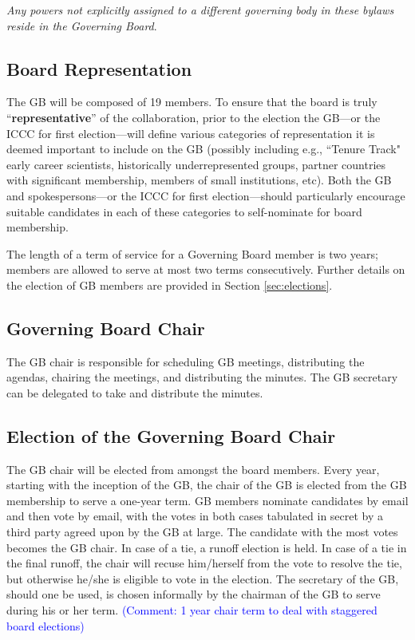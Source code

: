 \documentclass[12pt]{article}
\newcommand{\Comment}[1]{\textcolor{Blue}{(Comment: #1)}}
\begin{document}
\textit{Any powers not explicitly assigned to a different governing body in these bylaws reside in the Governing Board}. 

\subsection{Board Representation}
The GB will be composed of 19 members. 
To ensure that the board is truly ``\textbf{representative}'' of the collaboration, prior to the election the GB---or the ICCC for first election---will define various categories of representation it is deemed important to include on the GB (possibly including e.g., ``Tenure Track" early career scientists,  historically underrepresented groups, partner countries with significant membership, members of small institutions, etc). Both the GB and spokespersons---or the ICCC for first election---should particularly encourage suitable candidates in each of these categories to self-nominate for board membership.

The length of a term of service for a Governing Board member is two years; members are allowed to serve at most two terms consecutively.
Further details on the election of GB members are provided in Section \ref{sec:elections}.


\subsection{Governing Board Chair}

The GB chair is responsible for scheduling GB meetings, distributing the agendas, chairing the meetings, and distributing the minutes. The GB secretary can be delegated to take and distribute the minutes. 

\subsection{Election of the Governing Board Chair}
The GB chair will be elected from amongst the board members. 
Every year, starting with the inception of the GB, the chair of the GB is elected from the GB membership to serve a one-year term. GB members nominate candidates by email and then vote by email, with the votes in both cases tabulated in secret by a third party agreed upon by the GB at large. The candidate with the most votes becomes the GB chair. In case of a tie, a runoff election is held. In case of a tie in the final runoff, the chair will recuse him/herself from the vote to resolve the tie, but otherwise he/she is eligible to vote in the election. The secretary of the GB, should one be used, is chosen informally by the chairman of the GB to serve during his or her term. \Comment{1 year chair term to deal with staggered board elections}
\end{document}
